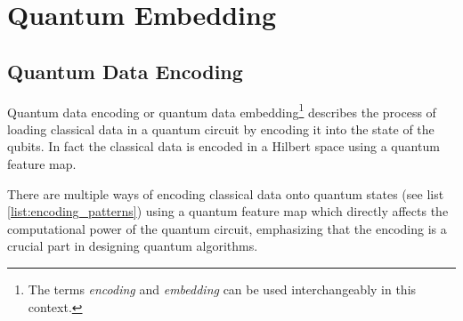 
\chapter{Quantum Embedding}
\label{chapter:quantum_embedding} %






\section{Quantum Data Encoding}\label{section:quantum_data_encoding}
Quantum data encoding or quantum data embedding\footnote{The terms \textit{encoding} and \textit{embedding} can be used interchangeably in this context.} describes the process of loading classical data in a quantum circuit by encoding it into the state of the qubits. In fact the classical data is encoded in a Hilbert space using a quantum feature map. 

There are multiple ways of encoding classical data onto quantum states (see list \ref{list:encoding_patterns}) using a quantum feature map which directly affects the computational power of the quantum circuit, emphasizing that the encoding is a crucial part in designing quantum algorithms.\cite{Quantum_machine_learning_in_feature_Hilbert_spaces_2019,Supervised_learning_with_quantum-enhanced_feature_spaces_2019,Quantum_embeddings_for_machine_learning_2020,PennyLane_QuantumEmbedding,PennyLane_QuantumFeatureMap,schuld2021supervised,leymann2019pattern}\par

